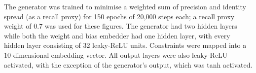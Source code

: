 \documentclass[../../main.tex]{subfiles}
\begin{document}


The generator was trained to minimise a weighted sum of precision and identity spread (as a recall proxy) for 150 epochs of 20,000 steps each; a recall proxy weight of $0.7$ was used for these figures.
The generator had two hidden layers while both the weight and bias embedder had one hidden layer, with every hidden layer consisting of 32 leaky-ReLU units.
Constraints were mapped into a $10$-dimensional embedding vector.
All output layers were also leaky-ReLU activated, with the exception of the generator's output, which was tanh activated.
\end{document}
